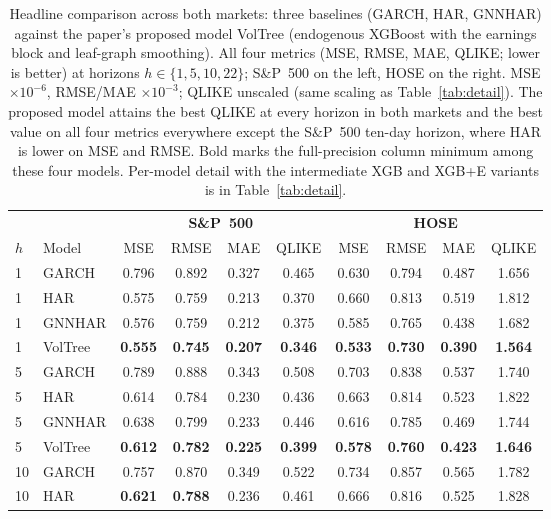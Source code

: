 \documentclass[runningheads]{llncs}
\begin{document}
\begin{table}[t]
\centering
\caption{Headline comparison across both markets: three baselines (GARCH, HAR, GNNHAR) against the paper's
proposed model VolTree (endogenous XGBoost with the earnings block and leaf-graph smoothing). All four
metrics (MSE, RMSE, MAE, QLIKE; lower is better) at horizons $h\in\{1,5,10,22\}$; S\&P~500 on the left,
HOSE on the right. MSE $\times10^{-6}$, RMSE/MAE $\times10^{-3}$; QLIKE unscaled (same scaling as
Table~\ref{tab:detail}). The proposed model attains the best QLIKE at every horizon in both markets
and the best value on all four metrics everywhere except the S\&P~500 ten-day horizon, where HAR is
lower on MSE and RMSE. Bold marks the full-precision column minimum among these four models. Per-model
detail with the intermediate XGB and XGB+E variants is in Table~\ref{tab:detail}.}
\label{tab:summary}
\footnotesize
\setlength{\tabcolsep}{3pt}
\begin{tabular}{ll cccc cccc}
\toprule
& & \multicolumn{4}{c}{\textbf{S\&P~500}} & \multicolumn{4}{c}{\textbf{HOSE}} \\
\cmidrule(lr){3-6}\cmidrule(lr){7-10}
$h$ & Model & MSE & RMSE & MAE & QLIKE & MSE & RMSE & MAE & QLIKE \\
\midrule
1 & GARCH    & 0.796 & 0.892 & 0.327 & 0.465 & 0.630 & 0.794 & 0.487 & 1.656 \\
1 & HAR      & 0.575 & 0.759 & 0.213 & 0.370 & 0.660 & 0.813 & 0.519 & 1.812 \\
1 & GNNHAR   & 0.576 & 0.759 & 0.212 & 0.375 & 0.585 & 0.765 & 0.438 & 1.682 \\
1 & VolTree & \textbf{0.555} & \textbf{0.745} & \textbf{0.207} & \textbf{0.346} & \textbf{0.533} & \textbf{0.730} & \textbf{0.390} & \textbf{1.564} \\
\midrule
5 & GARCH    & 0.789 & 0.888 & 0.343 & 0.508 & 0.703 & 0.838 & 0.537 & 1.740 \\
5 & HAR      & 0.614 & 0.784 & 0.230 & 0.436 & 0.663 & 0.814 & 0.523 & 1.822 \\
5 & GNNHAR   & 0.638 & 0.799 & 0.233 & 0.446 & 0.616 & 0.785 & 0.469 & 1.744 \\
5 & VolTree & \textbf{0.612} & \textbf{0.782} & \textbf{0.225} & \textbf{0.399} & \textbf{0.578} & \textbf{0.760} & \textbf{0.423} & \textbf{1.646} \\
\midrule
10 & GARCH    & 0.757 & 0.870 & 0.349 & 0.522 & 0.734 & 0.857 & 0.565 & 1.782 \\
10 & HAR      & \textbf{0.621} & \textbf{0.788} & 0.236 & 0.461 & 0.666 & 0.816 & 0.525 & 1.828 \\

\end{tabular}
\end{table}
\end{document}

